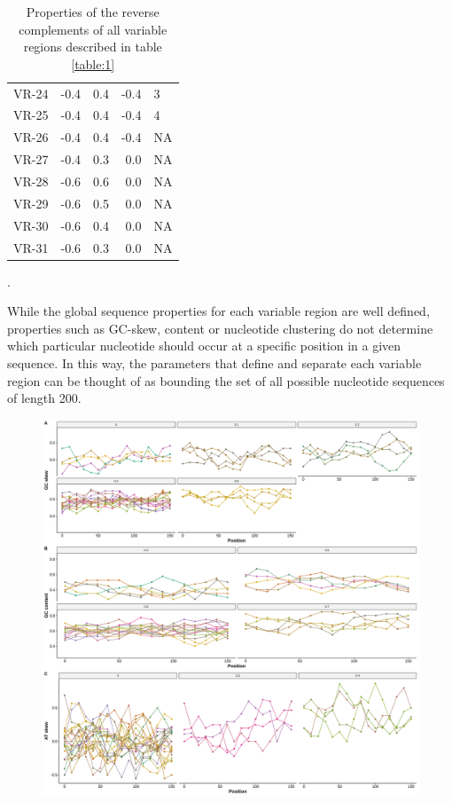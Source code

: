 \documentclass[11pt]{article}
\begin{document}
\begin{table}
\begin{tabular}{lrrrl}
	VR-24 &     -0.4 &         0.4 &     -0.4 &              3 \\
	VR-25 &     -0.4 &         0.4 &     -0.4 &              4 \\
	VR-26 &     -0.4 &         0.4 &     -0.4 &             NA \\
	VR-27 &     -0.4 &         0.3 &      0.0 &             NA \\
	VR-28 &     -0.6 &         0.6 &      0.0 &             NA \\
	VR-29 &     -0.6 &         0.5 &      0.0 &             NA \\
	VR-30 &     -0.6 &         0.4 &      0.0 &             NA \\
	VR-31 &     -0.6 &         0.3 &      0.0 &             NA \\
	\bottomrule
	
\end{tabular}
\caption{Properties of the reverse complements of all variable regions described in table \ref{table:1}}.
\label{table:2}
\end{table}

While the global sequence properties for each variable region are well defined, properties such as GC-skew, content or nucleotide clustering do not determine which particular nucleotide should occur at a specific position in a given sequence. In this way, the parameters that define and separate each variable region can be thought of as bounding the set of all possible nucleotide sequences of length 200. 

\begin{figure}[H]
	\includegraphics[width=18cm]{images/plots/attribute_variation_4bp_windows.png}
	\centering
	\caption{}
	\label{ranking4}
\end{figure}
\end{document}
